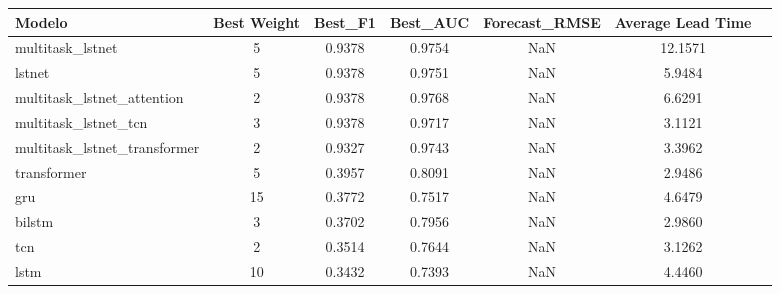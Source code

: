 \begin{tabular}{lcccccc}
\toprule
Modelo & Best Weight & Best_F1 & Best_AUC & Forecast_RMSE & Average Lead Time \\
\midrule
multitask_lstnet & 5 & 0.9378 & 0.9754 & NaN & 12.1571 \\
lstnet & 5 & 0.9378 & 0.9751 & NaN & 5.9484 \\
multitask_lstnet_attention & 2 & 0.9378 & 0.9768 & NaN & 6.6291 \\
multitask_lstnet_tcn & 3 & 0.9378 & 0.9717 & NaN & 3.1121 \\
multitask_lstnet_transformer & 2 & 0.9327 & 0.9743 & NaN & 3.3962 \\
transformer & 5 & 0.3957 & 0.8091 & NaN & 2.9486 \\
gru & 15 & 0.3772 & 0.7517 & NaN & 4.6479 \\
bilstm & 3 & 0.3702 & 0.7956 & NaN & 2.9860 \\
tcn & 2 & 0.3514 & 0.7644 & NaN & 3.1262 \\
lstm & 10 & 0.3432 & 0.7393 & NaN & 4.4460 \\
\bottomrule
\end{tabular}
